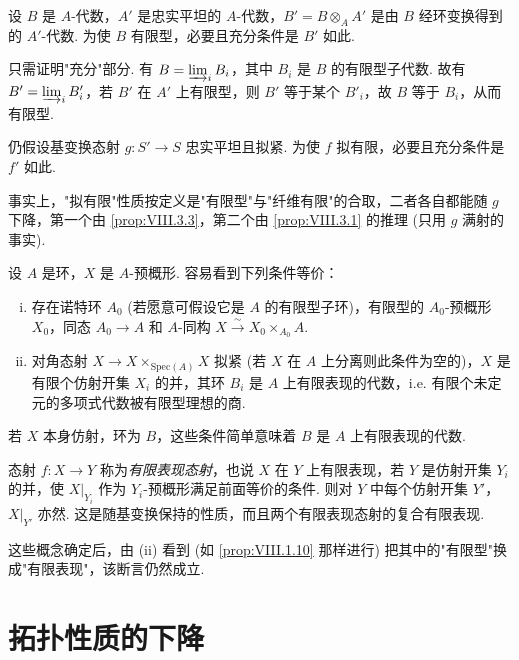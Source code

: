 \begin{corollary}\label{cor:VIII.3.4}
设 $B$ 是 $A$-代数，$A'$ 是忠实平坦的 $A$-代数，$B' = B \otimes_A A'$ 是由 $B$ 经环变换得到的 $A'$-代数. 为使 $B$ 有限型，必要且充分条件是 $B'$ 如此.
\end{corollary}

只需证明"充分"部分. 有 $B = \varinjlim_i B_i$，其中 $B_i$ 是 $B$ 的有限型子代数. 故有 $B' = \varinjlim_i B'_i$，若 $B'$ 在 $A'$ 上有限型，则 $B'$ 等于某个 $B'_i$，故 $B$ 等于 $B_i$，从而有限型.

\begin{corollary}\label{cor:VIII.3.5}
仍假设基变换态射 $g \colon S' \to S$ 忠实平坦且拟紧. 为使 $f$ 拟有限，必要且充分条件是 $f'$ 如此.
\end{corollary}

事实上，"拟有限"性质按定义是"有限型"与"纤维有限"的合取，二者各自都能随 $g$ 下降，第一个由 \ref{prop:VIII.3.3}，第二个由 \ref{prop:VIII.3.1} 的推理 (只用 $g$ 满射的事实).

\begin{remark}\label{rem:VIII.3.6}
设 $A$ 是环，$X$ 是 $A$-预概形. 容易看到下列条件等价：
\begin{enumerate}[i)]
\item 存在诺特环 $A_0$ (若愿意可假设它是 $A$ 的有限型子环)，有限型的 $A_0$-预概形 $X_0$，同态 $A_0 \to A$ 和 $A$-同构 $X \xrightarrow{\sim} X_0 \times_{A_0} A$.
\item 对角态射 $X \to X \times_{\mathrm{Spec}(A)} X$ 拟紧 (若 $X$ 在 $A$ 上分离则此条件为空的)，$X$ 是有限个仿射开集 $X_i$ 的并，其环 $B_i$ 是 $A$ 上有限表现的代数，i.e. 有限个未定元的多项式代数被有限型理想的商.
\end{enumerate}
若 $X$ 本身仿射，环为 $B$，这些条件简单意味着 $B$ 是 $A$ 上有限表现的代数.

态射 $f \colon X \to Y$ 称为\emph{有限表现态射}，也说 $X$ 在 $Y$ 上有限表现，若 $Y$ 是仿射开集 $Y_i$ 的并，使 $X|_{Y_i}$ 作为 $Y_i$-预概形满足前面等价的条件. 则对 $Y$ 中每个仿射开集 $Y'$，$X|_{Y'}$ 亦然. 这是随基变换保持的性质，而且两个有限表现态射的复合有限表现.

这些概念确定后，由 (ii) 看到 (如 \ref{prop:VIII.1.10} 那样进行) 把其中的"有限型"换成"有限表现"，该断言仍然成立.
\end{remark}

\section{拓扑性质的下降}

